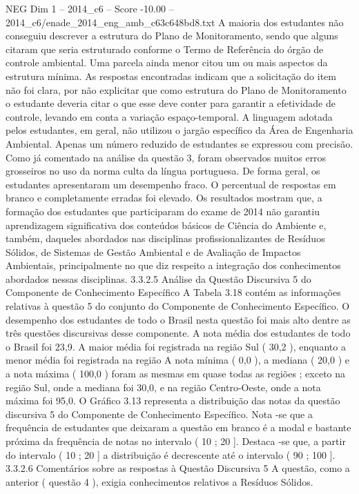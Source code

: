 \begin{textsample}{NEG Dim 1 – 2014\_c6 – Score -10.00 – 2014\_c6/enade\_2014\_eng\_amb\_c63c648bd8.txt}
A maioria dos estudantes não conseguiu descrever a estrutura do Plano de Monitoramento, sendo que alguns citaram que seria estruturado conforme o Termo de Referência do órgão de controle ambiental.
Uma parcela ainda menor citou um ou mais aspectos da estrutura mínima.
As respostas encontradas indicam que a solicitação do item não foi clara, por não explicitar que como estrutura do Plano de Monitoramento o estudante deveria citar o que esse deve conter para garantir a efetividade de controle, levando em conta a variação espaço-temporal.
A linguagem adotada pelos estudantes, em geral, não utilizou o jargão específico da Área de Engenharia Ambiental.
Apenas um número reduzido de estudantes se expressou com precisão.
Como já comentado na análise da questão 3, foram observados muitos erros grosseiros no uso da norma culta da língua portuguesa.
De forma geral, os estudantes apresentaram um desempenho fraco.
O percentual de respostas em branco e completamente erradas foi elevado.
Os resultados mostram que, a formação dos estudantes que participaram do exame de 2014 não garantiu aprendizagem significativa dos conteúdos básicos de Ciência do Ambiente e, também, daqueles abordados nas disciplinas profissionalizantes de Resíduos Sólidos, de Sistemas de Gestão Ambiental e de Avaliação de Impactos Ambientais, principalmente no que diz respeito a integração dos conhecimentos abordados nessas disciplinas. 3.3.2.5 Análise da Questão Discursiva 5 do Componente de Conhecimento Específico A Tabela 3.18 contém as informações relativas à questão 5 do conjunto do Componente de Conhecimento Específico.
O desempenho dos estudantes de todo o Brasil nesta questão foi mais alto dentre as três questões discursivas desse componente.
A nota média dos estudantes de todo o Brasil foi 23,9.
A maior média foi registrada na região Sul ( 30,2 ), enquanto a menor média foi registrada na região A nota mínima ( 0,0 ), a mediana ( 20,0 ) e a nota máxima ( 100,0 ) foram as mesmas em quase todas as regiões ; exceto na região Sul, onde a mediana foi 30,0, e na região Centro-Oeste, onde a nota máxima foi 95,0.
O Gráfico 3.13 representa a distribuição das notas da questão discursiva 5 do Componente de Conhecimento Específico.
Nota -se que a frequência de estudantes que deixaram a questão em branco é a modal e bastante próxima da frequência de notas no intervalo ( 10 ; 20 ].
Destaca -se que, a partir do intervalo ( 10 ; 20 ] a distribuição é decrescente até o intervalo ( 90 ; 100 ]. 3.3.2.6 Comentários sobre as respostas à Questão Discursiva 5 A questão, como a anterior ( questão 4 ), exigia conhecimentos relativos a Resíduos Sólidos.

\end{textsample}
